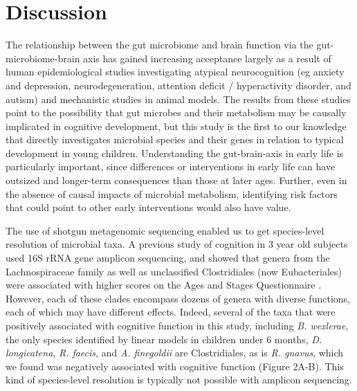 \documentclass{article}
\begin{document}
\section*{Discussion}

The relationship between the gut microbiome and brain function via the
gut-microbiome-brain axis has gained increasing acceptance largely as a
result of human epidemiological studies investigating atypical
neurocognition (eg anxiety and depression, neurodegeneration, attention
deficit / hyperactivity disorder, and autism) and mechanistic studies in
animal models. The results from these studies point to the possibility
that gut microbes and their metabolism may be causally implicated in
cognitive development, but this study is the first to our knowledge that
directly investigates microbial species and their genes in relation to
typical development in young children. Understanding the gut-brain-axis
in early life is particularly important, since differences or
interventions in early life can have outsized and longer-term
consequences than those at later ages. Further, even in the absence of
causal impacts of microbial metabolism, identifying risk factors that
could point to other early interventions would also have value.

The use of shotgun metagenomic sequencing enabled us to get
species-level resolution of microbial taxa. A previous study of
cognition in 3 year old subjects used 16S rRNA gene amplicon sequencing,
and showed that genera from the Lachnospiraceae family as well as
unclassified Clostridiales (now Eubacteriales) were associated with
higher scores on the Ages and Stages Questionnaire
\cite{sordilloAssociationInfantGut2019}.
However, each of these clades encompass dozens of genera with
diverse functions, each of which may have different effects. Indeed,
several of the taxa that were positively associated with cognitive
function in this study, including \emph{B. wexlerae}, the only species
identified by linear models in children under 6 months, \emph{D.
longicatena}, \emph{R. faecis}, and \emph{A. finegoldii} are
Clostridiales, as is \emph{R. gnavus}, which we found was negatively
associated with cognitive function (Figure 2A-B). This kind of
species-level resolution is typically not possible with amplicon
sequencing.
\end{document}
